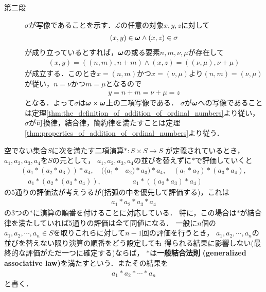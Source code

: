 \begin{prf}
\begin{description}
			\item[第二段]
				$\sigma$が写像であることを示す．$\mathcal{L}$の任意の対象$x,y,z$に対して
				\begin{align}
					(x,y) \in {\boldsymbol \omega} \wedge (x,z) \in \sigma
				\end{align}
				が成り立っているとすれば，${\boldsymbol \omega}$の或る要素$n,m,\nu,\mu$が存在して
				\begin{align}
					(x,y) = ((n,m),n+m) \wedge (x,z) = ((\nu,\mu),\nu+\mu)
				\end{align}
				が成立する．このとき$x=(n,m)$かつ$x=(\nu,\mu)$より$(n,m) = (\nu,\mu)$が従い，$n=\nu$かつ$m=\mu$となるので
				\begin{align}
					y = n+m = \nu+\mu = z
				\end{align}
				となる．よって$\sigma$は${\boldsymbol \omega} \times {\boldsymbol \omega}$上の二項写像である．
				$\sigma$が${\boldsymbol \omega}$への写像であることは定理\ref{thm:the_definition_of_addition_of_ordinal_numbers}より従い，
				$\sigma$が可換律，結合律，簡約律を満たすことは定理\ref{thm:properties_of_addition_of_ordinal_numbers}より従う．
				\QED
		\end{description}
	\end{prf}
	
	\begin{screen}
		\begin{dfn}[一般結合法則]
			空でない集合$S$に次を満たす二項演算$\ast:S \times S \longrightarrow S$
			が定義されているとき，$a_1,a_2,a_3,a_4$を$S$の元として，
			$a_1,a_2,a_3,a_4$の並びを替えずに$\ast$で評価していくと
			\begin{align}
				(a_1 \ast (a_2 \ast a_3)) \ast a_4,
				\quad ((a_1 \ast &a_2) \ast a_3) \ast a_4,
				\quad (a_1 \ast a_2) \ast (a_3 \ast a_4), \\
				\quad a_1 \ast (a_2 \ast (a_3 \ast a_4)),
				&\quad a_1 \ast ((a_2 \ast a_3) \ast a_4)
			\end{align}
			の5通りの評価法が考えうるが(括弧の中を優先して評価する)，これは
			\begin{align}
				a_1 \ast a_2 \ast a_3 \ast a_4
			\end{align}
			の3つの$\ast$に演算の順番を付けることに対応している．
			特に，この場合は$\ast$が結合律を満たしていれば5通りの評価は全て同値になる．
			一般に$n$個の$a_1,a_2,\cdots,a_n \in S$を取りこれらに対して$n-1$回の評価を行うとき，
			$a_1,a_2,\cdots,a_n$の並びを替えない限り演算の順番をどう設定しても
			得られる結果に影響しない(最終的な評価がただ一つに確定する)ならば，
			$\ast$は{\bf 一般結合法則}
			{\bf (generalized associative law)}を満たすという．またその結果を
			\begin{align}
				a_1 \ast a_2 \ast \cdots \ast a_n
			\end{align}
			と書く．
		\end{dfn}
	\end{screen}
	
